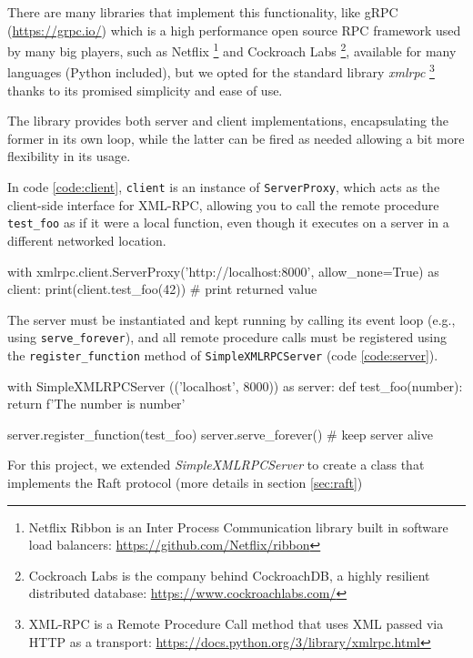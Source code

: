 There are many libraries that implement this functionality, like gRPC (\url{https://grpc.io/}) which is a high performance open source RPC framework used by many big players, such as Netflix \footnote{Netflix Ribbon is an Inter Process Communication library built in software load balancers: \url{https://github.com/Netflix/ribbon}} and Cockroach Labs \footnote{Cockroach Labs is the company behind CockroachDB, a highly resilient distributed database: \url{https://www.cockroachlabs.com/}}, available for many languages (Python included), but we opted for the standard library \textit{xmlrpc} \footnote{XML-RPC is a Remote Procedure Call method that uses XML passed via HTTP as a transport: \url{https://docs.python.org/3/library/xmlrpc.html}} thanks to its promised simplicity and ease of use. 

The library provides both server and client implementations, encapsulating the former in its own loop, while the latter can be fired as needed allowing a bit more flexibility in its usage.

In code \ref{code:client}, \verb|client| is an instance of \verb|ServerProxy|, which acts as the client-side interface for XML-RPC, allowing you to call the remote procedure \verb|test_foo| as if it were a local function, even though it executes on a server in a different networked location.

\begin{python}[label={code:client}, caption={Client as server proxy}]
with xmlrpc.client.ServerProxy('http://localhost:8000', allow_none=True) as client:
    print(client.test_foo(42)) # print returned value
\end{python}

The server must be instantiated and kept running by calling its event loop (e.g., using \verb|serve_forever|), and all remote procedure calls must be registered using the \verb|register_function| method of \verb|SimpleXMLRPCServer| (code \ref{code:server}).

\begin{python}[label={code:server}, caption={Server}]
with SimpleXMLRPCServer (('localhost', 8000)) as server:
    def test_foo(number):
        return f'The number is {number}'

    server.register_function(test_foo)  
    server.serve_forever() # keep server alive
\end{python}

For this project, we extended \textit{SimpleXMLRPCServer} to create a class that implements the Raft protocol (more details in section \ref{sec:raft})

